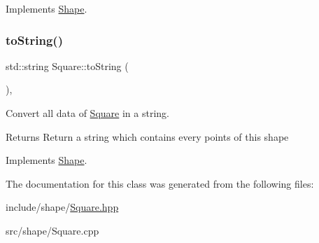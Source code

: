 Implements \hyperlink{classShape_a2dea8616fd40f2d69fd208715921982a}{Shape}.

\mbox{\label{classSquare_aa5d7db8004bba3c400f57513d93b21d4}} 
\subsubsection{\texorpdfstring{to\+String()}{toString()}}
{\footnotesize\ttfamily std\+::string Square\+::to\+String (\begin{DoxyParamCaption}{ }\end{DoxyParamCaption})\hspace{0.3cm}{\ttfamily [override]}, {\ttfamily [virtual]}}



Convert all data of \hyperlink{classSquare}{Square} in a string. 

\begin{DoxyReturn}{Returns}
Return a string which contains every points of this shape 
\end{DoxyReturn}


Implements \hyperlink{classShape_a98fa87c6dc4c7045fd6897a8f3bc186c}{Shape}.



The documentation for this class was generated from the following files\+:\begin{DoxyCompactItemize}
\item 
include/shape/\hyperlink{Square_8hpp}{Square.\+hpp}\item 
src/shape/Square.\+cpp\end{DoxyCompactItemize}
